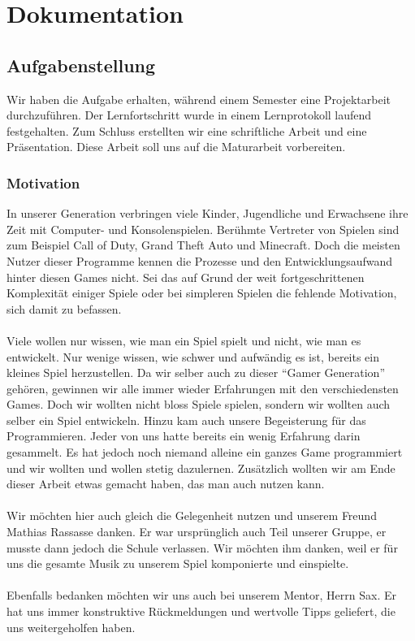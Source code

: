 \documentclass[11pt,a4paper]{scrbook}
\newcommand{\q}[1]{``#1''}
\begin{document}
\thispagestyle{empty}
\clearscrheadfoot
\lofoot[\pagemark]{\pagemark}
\thispagestyle{empty}
\tableofcontents

\clearpage
{}


\part{Dokumentation}
\chapter{Aufgabenstellung}
Wir haben die Aufgabe erhalten, während einem Semester eine Projektarbeit durchzuführen. Der Lernfortschritt wurde in einem Lernprotokoll laufend festgehalten.
Zum Schluss erstellten wir eine schriftliche Arbeit und eine Präsentation. Diese Arbeit soll uns auf die Maturarbeit vorbereiten.

\section{Motivation}
In unserer Generation verbringen viele Kinder, Jugendliche und Erwachsene ihre Zeit mit Computer- und Konsolenspielen.
Berühmte Vertreter von Spielen sind zum Beispiel Call of Duty, Grand Theft Auto und Minecraft.
Doch die meisten Nutzer dieser Programme kennen die Prozesse und den Entwicklungsaufwand hinter diesen Games nicht.
Sei das auf Grund der weit fortgeschrittenen Komplexität einiger Spiele
oder bei simpleren Spielen die fehlende Motivation, sich damit zu befassen.\\
\\
Viele wollen nur wissen, wie man ein Spiel spielt und nicht, wie man es entwickelt. Nur wenige wissen, wie schwer und aufwändig es ist, bereits ein kleines Spiel herzustellen.
Da wir selber auch zu dieser \q{Gamer Generation} gehören,
gewinnen wir alle immer wieder Erfahrungen mit den verschiedensten Games.
Doch wir wollten nicht bloss Spiele spielen,
sondern wir wollten auch selber ein Spiel entwickeln.
Hinzu kam auch unsere Begeisterung für das Programmieren.
Jeder von uns hatte bereits ein wenig Erfahrung darin gesammelt.
Es hat jedoch noch niemand alleine
ein ganzes Game programmiert und
wir wollten und wollen stetig dazulernen.
Zusätzlich wollten wir am Ende dieser Arbeit etwas gemacht haben, das man auch nutzen kann.\\
\\
Wir möchten hier auch gleich die Gelegenheit nutzen und unserem Freund Mathias Rassasse danken. Er war ursprünglich auch Teil unserer Gruppe, er musste dann jedoch die Schule verlassen. Wir möchten ihm danken, weil er für uns die gesamte Musik zu unserem Spiel komponierte und einspielte.\\
\\
Ebenfalls bedanken möchten wir uns auch bei unserem Mentor, Herrn Sax. Er hat uns immer konstruktive Rückmeldungen und wertvolle Tipps geliefert, die uns weitergeholfen haben.
\end{document}
